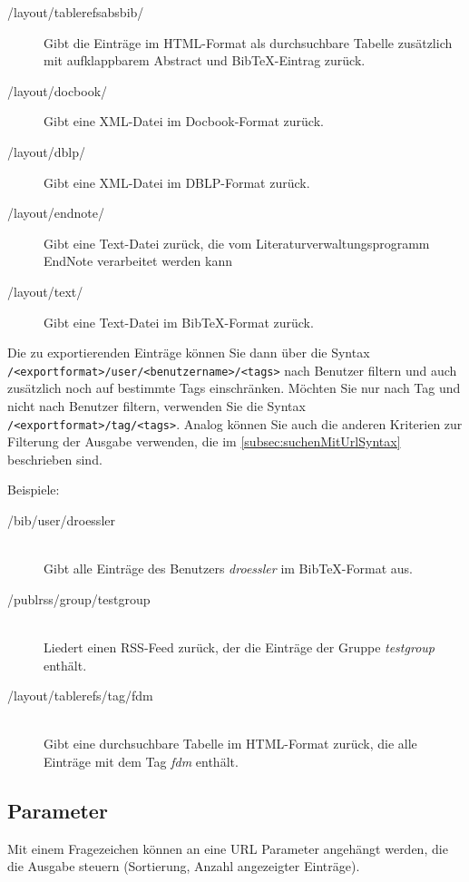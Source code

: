 \begin{itemize}
\begin{description}
  \item[/layout/tablerefsabsbib/] Gibt die Einträge im HTML-Format als durchsuchbare Tabelle zusätzlich mit aufklappbarem Abstract und BibTeX-Eintrag zurück.
  \item[/layout/docbook/] Gibt eine XML-Datei im Docbook-Format zurück.
  \item[/layout/dblp/] Gibt eine XML-Datei im DBLP-Format zurück.
  \item[/layout/endnote/] Gibt eine Text-Datei zurück, die vom Literaturverwaltungsprogramm EndNote verarbeitet werden kann
  \item[/layout/text/] Gibt eine Text-Datei im BibTeX-Format zurück.
    \end{description}
\end{itemize}

Die zu exportierenden Einträge können Sie dann über die Syntax \texttt{/<exportformat>/user/<benutzername>/<tags>} nach Benutzer filtern und auch zusätzlich noch auf bestimmte Tags einschränken. Möchten Sie nur nach Tag und nicht nach Benutzer filtern, verwenden Sie die Syntax \texttt{/<exportformat>/tag/<tags>}. Analog können Sie auch die anderen Kriterien zur Filterung der Ausgabe verwenden, die im \autoref{subsec:suchenMitUrlSyntax} beschrieben sind.

Beispiele:
\label{subsec:volltextsuche}
\begin{description}
    \item [/bib/user/droessler] \hfill \\
    Gibt alle Einträge des Benutzers \textit{droessler} im BibTeX-Format aus.
    \item [/publrss/group/testgroup] \hfill \\
      Liedert einen RSS-Feed zurück, der die Einträge der Gruppe \textit{testgroup} enthält.
    \item [/layout/tablerefs/tag/fdm] \hfill \\
      Gibt eine durchsuchbare Tabelle im HTML-Format zurück, die alle Einträge mit dem Tag \textit{fdm} enthält. 
\end{description}

\subsection{Parameter}
\label{subsec:parameter}
Mit einem Fragezeichen können an eine URL Parameter angehängt werden, die die Ausgabe steuern (Sortierung, Anzahl angezeigter Einträge).

